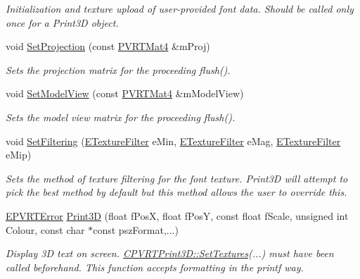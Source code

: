 \begin{DoxyCompactItemize}
\begin{DoxyCompactList}\small\item\em Initialization and texture upload of user-\/provided font data. Should be called only once for a Print3\+D object. \end{DoxyCompactList}\item 
void \hyperlink{class_c_p_v_r_t_print3_d_ab40a04460c358803df8f03437ff5da84}{Set\+Projection} (const \hyperlink{struct_p_v_r_t_mat4}{P\+V\+R\+T\+Mat4} \&m\+Proj)
\begin{DoxyCompactList}\small\item\em Sets the projection matrix for the proceeding flush(). \end{DoxyCompactList}\item 
void \hyperlink{class_c_p_v_r_t_print3_d_a02b27a8b2c6c46baf330365817d76c94}{Set\+Model\+View} (const \hyperlink{struct_p_v_r_t_mat4}{P\+V\+R\+T\+Mat4} \&m\+Model\+View)
\begin{DoxyCompactList}\small\item\em Sets the model view matrix for the proceeding flush(). \end{DoxyCompactList}\item 
void \hyperlink{class_c_p_v_r_t_print3_d_a7748f071e86a58f6128832c5043da01a}{Set\+Filtering} (\hyperlink{_p_v_r_t_global_8h_a21d72bffd820f4e5eb29d92ff78804c1}{E\+Texture\+Filter} e\+Min, \hyperlink{_p_v_r_t_global_8h_a21d72bffd820f4e5eb29d92ff78804c1}{E\+Texture\+Filter} e\+Mag, \hyperlink{_p_v_r_t_global_8h_a21d72bffd820f4e5eb29d92ff78804c1}{E\+Texture\+Filter} e\+Mip)
\begin{DoxyCompactList}\small\item\em Sets the method of texture filtering for the font texture. Print3\+D will attempt to pick the best method by default but this method allows the user to override this. \end{DoxyCompactList}\item 
\hyperlink{_p_v_r_t_error_8h_a9e837ff1a83f3a5f332bc4cc78454608}{E\+P\+V\+R\+T\+Error} \hyperlink{class_c_p_v_r_t_print3_d_afd98a5ba4e3f9183ceb615566a64f843}{Print3\+D} (float f\+Pos\+X, float f\+Pos\+Y, const float f\+Scale, unsigned int Colour, const char $\ast$const psz\+Format,...)
\begin{DoxyCompactList}\small\item\em Display 3\+D text on screen. \hyperlink{class_c_p_v_r_t_print3_d_a83a1fbe0a34d14a6a0d206b1e555dda7}{C\+P\+V\+R\+T\+Print3\+D\+::\+Set\+Textures}(...) must have been called beforehand. This function accepts formatting in the printf way. \end{DoxyCompactList}\item 

\end{DoxyCompactItemize}
